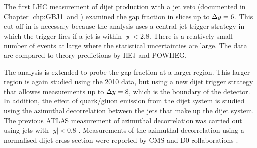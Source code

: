 The first LHC measurement of dijet production with a jet veto (documented in Chapter \ref{chp:GBJ1} and \cite{ref:ATLASGap}) examined the gap fraction in slices \ptb{} up to $\mbox{$\Delta y$}{}=6$.
This cut-off in \dy{} is necessary because the analysis uses a central jet trigger strategy in which the trigger fires if a jet is within $|y|<2.8$.
There is a relatively small number of events at large \dy{} where the statistical uncertainties are large. 
The data are compared to theory predictions by HEJ and POWHEG.

The analysis is extended to probe the gap fraction at a larger \dy{} region.
This larger \dy{} region is again studied using the 2010 data, but using a new dijet trigger strategy that allowes measurements up to $\mbox{$\Delta y$}{}=8$, which is the boundary of the detector.
In addition, the effect of quark/gluon emission from the dijet system is studied using the azimuthal decorrelation between the jets that make up the dijet system.
The previous ATLAS measurement of azimuthal decorrelation was carried out using jets with $|y| < 0.8$ \cite{ref:Decorr}.
Measurements of the azimuthal decorrelation using a normalised dijet cross section were reported by CMS and D0 collaborations \cite{ref:D0Azi,ref:CMSAzi}.

